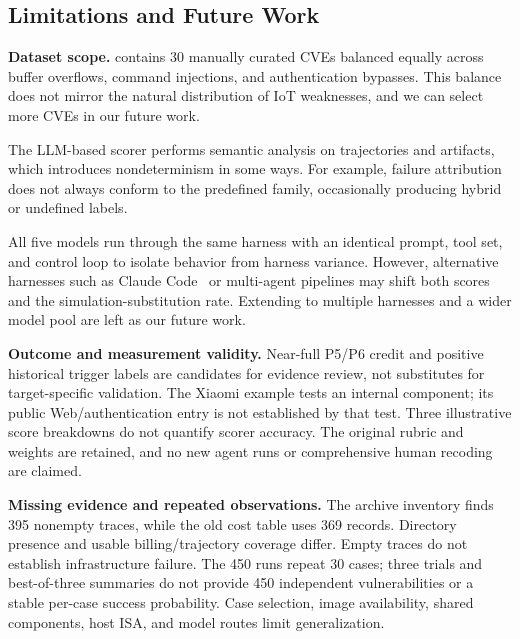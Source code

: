 \subsection{Limitations and Future Work}
\label{sec:limitations}

\textbf{Dataset scope.} \sys{} contains 30 manually curated CVEs balanced equally across buffer overflows, command injections, and authentication bypasses. This balance does not mirror the natural distribution of IoT weaknesses, and we can select more CVEs in our future work.


 The LLM-based scorer performs semantic analysis on trajectories and artifacts, which introduces nondeterminism in some ways. For example, failure attribution does not always conform to the predefined family, occasionally producing hybrid or undefined labels.

 All five models run through the same harness with an identical prompt, tool set, and control loop to isolate behavior from harness variance. However, alternative harnesses such as Claude Code~\cite{claude_code2026} or multi-agent pipelines may shift both scores and the simulation-substitution rate. Extending \sys{} to multiple harnesses and a wider model pool are left as our future work.

\noindent\textbf{Outcome and measurement validity.} Near-full P5/P6 credit and positive historical trigger labels are candidates for evidence review, not substitutes for target-specific validation. The Xiaomi example tests an internal component; its public Web/authentication entry is not established by that test. Three illustrative score breakdowns do not quantify scorer accuracy. The original rubric and weights are retained, and no new agent runs or comprehensive human recoding are claimed.

\noindent\textbf{Missing evidence and repeated observations.} The archive inventory finds 395 nonempty traces, while the old cost table uses 369 records. Directory presence and usable billing/trajectory coverage differ. Empty traces do not establish infrastructure failure. The 450 runs repeat 30 cases; three trials and best-of-three summaries do not provide 450 independent vulnerabilities or a stable per-case success probability. Case selection, image availability, shared components, host ISA, and model routes limit generalization.
